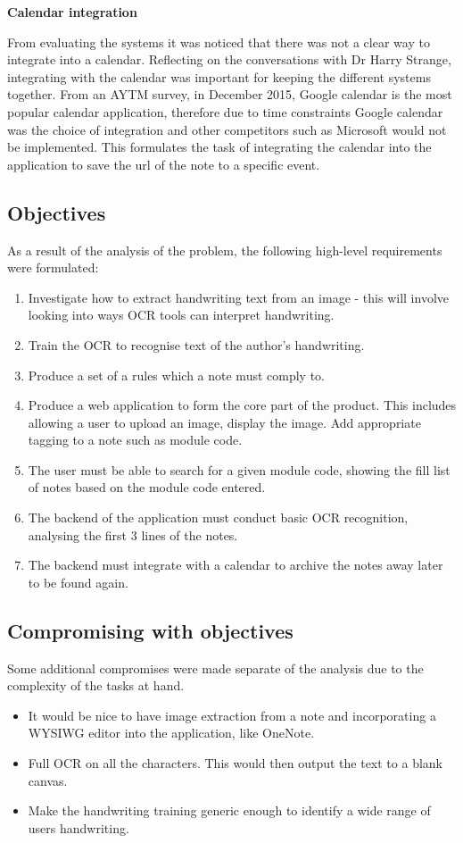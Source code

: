 \noindent
\textbf{Calendar integration}


From evaluating the systems it was noticed that there was not a clear way to integrate into a calendar. Reflecting on the conversations with Dr Harry Strange, integrating with the calendar was important for keeping the different systems together. From an AYTM survey, in December 2015, \cite{citeulike:14010520} Google calendar is the most popular calendar application, therefore due to time constraints Google calendar was the choice of integration and other competitors such as Microsoft would not be implemented. This formulates the task of integrating the calendar into the application to save the url of the note to a specific event.

\subsection{Objectives}
As a result of the analysis of the problem, the following high-level requirements were formulated:
\begin{enumerate}
	\item Investigate how to extract handwriting text from an image - this will involve looking into ways OCR tools can interpret handwriting.
	\item Train the OCR to recognise text of the author's handwriting.
	\item Produce a set of a rules which a note must comply to.
	\item Produce a web application to form the core part of the product. This includes allowing a user to upload an image, display the image. Add appropriate tagging to a note such as module code.
	\item The user must be able to search for a given module code, showing the fill list of notes based on the module code entered.
	\item The backend of the application must conduct basic OCR recognition, analysing the first 3 lines of the notes.
	\item The backend must integrate with a calendar to archive the notes away later to be found again.
\end{enumerate}

\subsection{Compromising with objectives}
Some additional compromises were made separate of the analysis due to the complexity of the tasks at hand.
\begin{itemize}
	\item It would be nice to have image extraction from a note and incorporating a WYSIWG editor into the application, like OneNote.
	\item Full OCR on all the characters. This would then output the text to a blank canvas.
	\item Make the handwriting training generic enough to identify a wide range of users handwriting.
\end{itemize}

